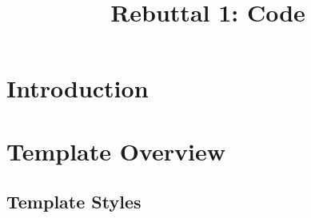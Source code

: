 \title{Rebuttal 1: Code}

\maketitle

\section{Introduction}

\section{Template Overview}

\subsection{Template Styles}